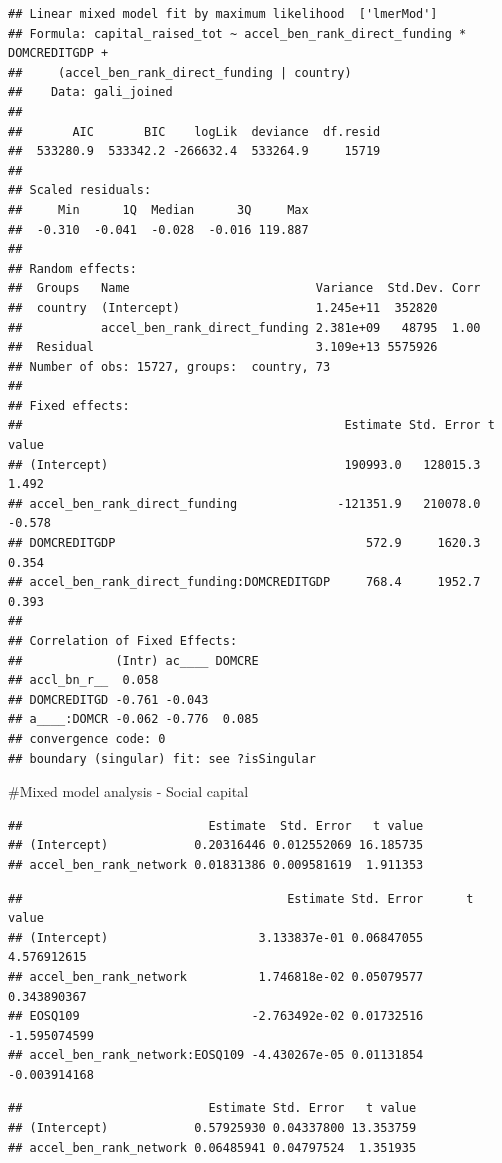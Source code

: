 \documentclass[
  english,
  man]{apa6}
\begin{document}
\begin{verbatim}
## Linear mixed model fit by maximum likelihood  ['lmerMod']
## Formula: capital_raised_tot ~ accel_ben_rank_direct_funding * DOMCREDITGDP +  
##     (accel_ben_rank_direct_funding | country)
##    Data: gali_joined
## 
##       AIC       BIC    logLik  deviance  df.resid 
##  533280.9  533342.2 -266632.4  533264.9     15719 
## 
## Scaled residuals: 
##     Min      1Q  Median      3Q     Max 
##  -0.310  -0.041  -0.028  -0.016 119.887 
## 
## Random effects:
##  Groups   Name                          Variance  Std.Dev. Corr
##  country  (Intercept)                   1.245e+11  352820      
##           accel_ben_rank_direct_funding 2.381e+09   48795  1.00
##  Residual                               3.109e+13 5575926      
## Number of obs: 15727, groups:  country, 73
## 
## Fixed effects:
##                                             Estimate Std. Error t value
## (Intercept)                                 190993.0   128015.3   1.492
## accel_ben_rank_direct_funding              -121351.9   210078.0  -0.578
## DOMCREDITGDP                                   572.9     1620.3   0.354
## accel_ben_rank_direct_funding:DOMCREDITGDP     768.4     1952.7   0.393
## 
## Correlation of Fixed Effects:
##             (Intr) ac____ DOMCRE
## accl_bn_r__  0.058              
## DOMCREDITGD -0.761 -0.043       
## a____:DOMCR -0.062 -0.776  0.085
## convergence code: 0
## boundary (singular) fit: see ?isSingular
\end{verbatim}

\#Mixed model analysis - Social capital

\begin{verbatim}
##                          Estimate  Std. Error   t value
## (Intercept)            0.20316446 0.012552069 16.185735
## accel_ben_rank_network 0.01831386 0.009581619  1.911353
\end{verbatim}

\begin{verbatim}
##                                     Estimate Std. Error      t value
## (Intercept)                     3.133837e-01 0.06847055  4.576912615
## accel_ben_rank_network          1.746818e-02 0.05079577  0.343890367
## EOSQ109                        -2.763492e-02 0.01732516 -1.595074599
## accel_ben_rank_network:EOSQ109 -4.430267e-05 0.01131854 -0.003914168
\end{verbatim}

\begin{verbatim}
##                          Estimate Std. Error   t value
## (Intercept)            0.57925930 0.04337800 13.353759
## accel_ben_rank_network 0.06485941 0.04797524  1.351935
\end{verbatim}
\end{document}
